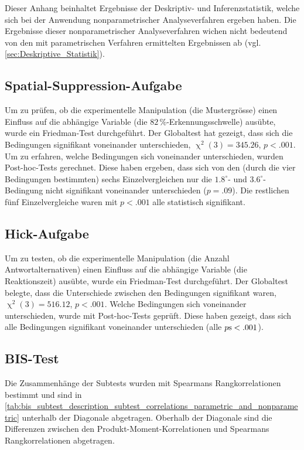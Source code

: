 \documentclass[11pt, twoside, a4paper]{book}		%
\begin{document}
Dieser Anhang beinhaltet Ergebnisse der Deskriptiv- und Inferenzstatistik, welche sich bei der Anwendung nonparametrischer Analyseverfahren ergeben haben. Die Ergebnisse dieser nonparametrischer Analyseverfahren wichen nicht bedeutend von den mit parametrischen Verfahren ermittelten Ergebnissen ab (vgl. \autoref{sec:Deskriptive_Statistik}).

\subsection*{Spatial-Suppression-Aufgabe}

Um zu prüfen, ob die experimentelle Manipulation (die Mustergrösse) einen Einfluss auf die abhängige Variable (die $82\,\%$-Er\-ken\-nungs\-schwel\-le) ausübte, wurde ein Friedman-Test durchgeführt. Der Globaltest hat gezeigt, dass sich die Bedingungen signifikant voneinander unterschieden, $\upchi^2(3)=345.26$, $p<.001$. 
Um zu erfahren, welche Bedingungen sich voneinander unterschieden, wurden Post-hoc-Tests \citep{Galili2010, Hollander2014} gerechnet. Diese haben ergeben, dass sich von den (durch die vier Bedingungen bestimmten) sechs Einzelvergleichen nur die $1.8^{\circ}$- und $3.6^{\circ}$-Bedingung nicht signifikant voneinander unterschieden ($p=.09$). Die restlichen fünf Einzelvergleiche waren mit $p<.001$ alle statistisch signifikant.

\subsection*{Hick-Aufgabe}

Um zu testen, ob die experimentelle Manipulation (die Anzahl Antwortalternativen) einen Einfluss auf die abhängige Variable (die Reaktionszeit) ausübte, wurde ein Friedman-Test durchgeführt. Der Globaltest belegte, dass die Unterschiede zwischen den Bedingungen signifikant waren, $\upchi^2(3)=516.12$, $p<.001$. Welche Bedingungen sich voneinander unterschieden, wurde mit Post-hoc-Tests \citep{Galili2010, Hollander2014} geprüft. Diese haben gezeigt, dass sich alle Bedingungen signifikant voneinander unterschieden (alle $p\textnormal{s}<.001$). 

\subsection*{BIS-Test}

Die Zusammenhänge der Subtests wurden mit Spearmans Rangkorrelationen bestimmt und sind in \autoref{tab:bis_subtest_description_subtest_correlations_parametric_and_nonparametric} unterhalb der Diagonale abgetragen. Oberhalb der Diagonale sind die Differenzen zwischen den Produkt-Moment-Korrelationen und Spearmans Rangkorrelationen abgetragen.
\end{document}
